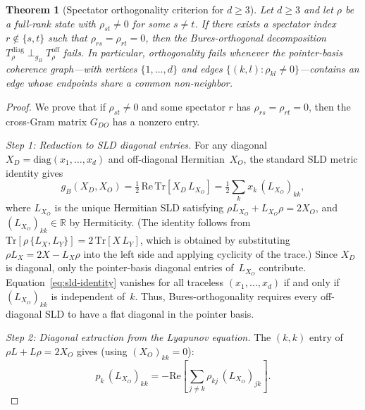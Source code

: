 \documentclass[12pt,a4paper]{article}
\newtheorem{theorem}{Theorem}[section]
\theoremstyle{definition}
\theoremstyle{remark}
\begin{document}
\begin{theorem}[Spectator orthogonality criterion for $d \geq 3$]
\label{thm:spectator-orthogonality}
Let $d \geq 3$ and let $\rho$ be a full-rank state with $\rho_{st} \neq 0$ for some $s \neq t$.  If there exists a spectator index $r \notin \{s,t\}$ such that $\rho_{rs} = \rho_{rt} = 0$, then the Bures-orthogonal decomposition $T_\rho^{\mathrm{diag}} \perp_{g_B} T_\rho^{\mathrm{off}}$ fails.  In particular, orthogonality fails whenever the pointer-basis coherence graph---with vertices $\{1,\ldots,d\}$ and edges $\{(k,l) : \rho_{kl} \neq 0\}$---contains an edge whose endpoints share a common non-neighbor.
\end{theorem}

\begin{proof}
We prove that if $\rho_{st} \neq 0$ and some spectator $r$ has $\rho_{rs} = \rho_{rt} = 0$, then the cross-Gram matrix $G_{DO}$ has a nonzero entry.

\emph{Step 1: Reduction to SLD diagonal entries.}
For any diagonal $X_D = \mathrm{diag}(x_1, \ldots, x_d)$ and off-diagonal Hermitian~$X_O$, the standard SLD metric identity gives
\begin{equation}
\label{eq:sld-identity}
g_B(X_D, X_O) = \tfrac{1}{2}\,\mathrm{Re}\,\mathrm{Tr}[X_D\, L_{X_O}] = \tfrac{1}{2}\sum_k x_k\, (L_{X_O})_{kk},
\end{equation}
where $L_{X_O}$ is the unique Hermitian SLD satisfying $\rho L_{X_O} + L_{X_O} \rho = 2 X_O$, and $(L_{X_O})_{kk} \in \mathbb{R}$ by Hermiticity.  (The identity follows from $\mathrm{Tr}[\rho\,\{L_X, L_Y\}] = 2\,\mathrm{Tr}[X\, L_Y]$, which is obtained by substituting $\rho L_X = 2X - L_X\rho$ into the left side and applying cyclicity of the trace.)  Since $X_D$ is diagonal, only the pointer-basis diagonal entries of~$L_{X_O}$ contribute. Equation~\eqref{eq:sld-identity} vanishes for all traceless $(x_1, \ldots, x_d)$ if and only if $(L_{X_O})_{kk}$ is independent of~$k$.  Thus, Bures-orthogonality requires every off-diagonal SLD to have a flat diagonal in the pointer basis.

\emph{Step 2: Diagonal extraction from the Lyapunov equation.}
The $(k,k)$ entry of $\rho L + L\rho = 2X_O$ gives (using $(X_O)_{kk} = 0$):
\begin{equation}
\label{eq:lyapunov-diag}
p_k\,(L_{X_O})_{kk} = -\mathrm{Re}\!\left[\sum_{j \neq k} \rho_{kj}\,(L_{X_O})_{jk}\right].
\end{equation}


\end{proof}
\end{document}

